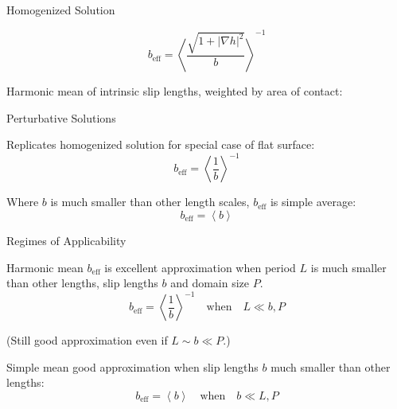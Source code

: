 \documentclass{beamer}
\newcommand{\beff}{\ensuremath{b_{\mathrm{eff}}}}
\begin{document}
\begin{frame}{Homogenized Solution}

\begin{equation}
\beff = \left< \frac{\sqrt{1 + \lvert \nabla h \rvert^2}}{b} \right> ^{-1}
\label{eq:homogharm}
\end{equation}

Harmonic mean of intrinsic slip lengths, weighted by area of contact:

\begin{center}
\end{center}

\end{frame}

\begin{frame}{Perturbative Solutions}

Replicates homogenized solution for special case of flat surface:
\begin{equation}
\beff = \left< \frac{1}{b} \right>^{-1}
\end{equation}

\vspace{1em}
Where $b$ is much smaller than other length scales, $\beff$ is simple average:
\begin{equation}
\beff = \left< b \right>
\end{equation}

\end{frame}

\begin{frame}{Regimes of Applicability}

Harmonic mean $\beff$ is excellent approximation when period $L$ is much smaller than other lengths, slip lengths $b$ and domain size $P$.
\begin{equation}
\beff = \left< \frac{1}{b} \right>^{-1}
\quad \text{when} \quad
L \ll b, P
\end{equation}

(Still good approximation even if $L \sim b \ll P$.)

\vspace{1em}
Simple mean good approximation when slip lengths $b$ much smaller than other lengths:
\begin{equation}
\beff = \left< b \right>
\quad \text{when} \quad
b \ll L, P
\end{equation}

\end{frame}
\end{document}
